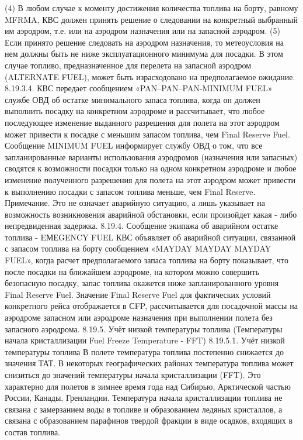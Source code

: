 (4) В любом случае к моменту достижения количества топлива на борту, равному MFRMA, КВС должен принять решение о следовании на конкретный выбранный им аэродром, т.е. или на аэродром назначения или на запасной аэродром.
(5) Если принято решение следовать на аэродром назначения, то метеоусловия на нем должны быть не ниже эксплуатационного минимума для посадки. В этом случае топливо, предназначенное для перелета на запасной аэродром (ALTERNATE FUEL), может быть израсходовано на предполагаемое ожидание.
8.19.3.4. КВС передает сообщением «PAN–PAN–PAN-MINIMUM FUEL» службе ОВД об остатке минимального запаса топлива, когда он должен выполнить посадку на конкретном аэродроме и рассчитывает, что любое последующее изменение выданного разрешения для полета на этот аэродром может привести к посадке с меньшим запасом топлива, чем Final Reserve Fuel.
Сообщение MINIMUM FUEL информирует службу ОВД о том, что все запланированные варианты использования аэродромов (назначения или запасных) сводятся к возможности посадки только на одном конкретном аэродроме и любое изменение полученного разрешения для полета на этот аэродром может привести к выполнению посадки с запасом топлива меньше, чем Final Reserve.
Примечание. Это не означает аварийную ситуацию, а лишь указывает на возможность возникновения аварийной обстановки, если произойдет какая - либо непредвиденная задержка.
8.19.4.	Сообщение экипажа об аварийном остатке топлива - EМЕGENCY FUEL
КВС объявляет об аварийной ситуации, связанной с запасом топлива на борту сообщением «MAYDAY MAYDAY MAYDAY FUEL», когда расчет предполагаемого запаса топлива на борту показывает, что после посадки на ближайшем аэродроме, на котором можно совершить безопасную посадку, запас топлива окажется ниже запланированного уровня Final Reserve Fuel.
Значение Final Reserve Fuel для фактических условий конкретного рейса отображается в СFP, рассчитывается для посадочной массы на аэродроме запасном или аэродроме назначения при выполнении полета без запасного аэродрома.
8.19.5.	Учёт низкой температуры топлива (Температуры начала кристаллизации Fuel Freeze Temperature - FFT)
8.19.5.1. Учёт низкой температуры топлива В полете температура топлива постепенно снижается до значения ТАТ. В некоторых географических районах температура топлива может снизиться до значений температуры начала кристаллизации (FFT). Это характерно для полетов в зимнее время года над Сибирью, Арктической частью России, Канады, Гренландии.
Температура начала кристаллизации топлива не связана с замерзанием воды в топливе и образованием ледяных кристаллов, а связана с образованием парафинов твердой фракции в виде осадков, входящих в состав топлива.
